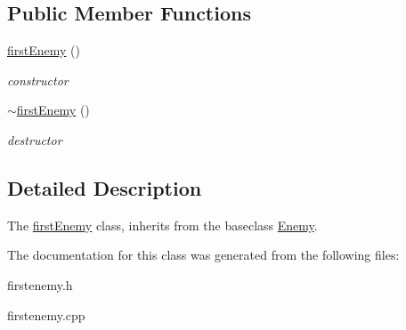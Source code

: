 \subsection*{Public Member Functions}
\begin{DoxyCompactItemize}
\item 
\mbox{\label{classfirstEnemy_af56c2b9a8dfc696a6f43c171e860e1fd}} 
\hyperlink{classfirstEnemy_af56c2b9a8dfc696a6f43c171e860e1fd}{first\+Enemy} ()
\begin{DoxyCompactList}\small\item\em constructor \end{DoxyCompactList}\item 
\mbox{\label{classfirstEnemy_a25f54a3161da80321f6f9f2c713f83e3}} 
\hyperlink{classfirstEnemy_a25f54a3161da80321f6f9f2c713f83e3}{$\sim$first\+Enemy} ()
\begin{DoxyCompactList}\small\item\em destructor \end{DoxyCompactList}\end{DoxyCompactItemize}


\subsection{Detailed Description}
The \hyperlink{classfirstEnemy}{first\+Enemy} class, inherits from the baseclass \hyperlink{classEnemy}{Enemy}. 

The documentation for this class was generated from the following files\+:\begin{DoxyCompactItemize}
\item 
firstenemy.\+h\item 
firstenemy.\+cpp\end{DoxyCompactItemize}
